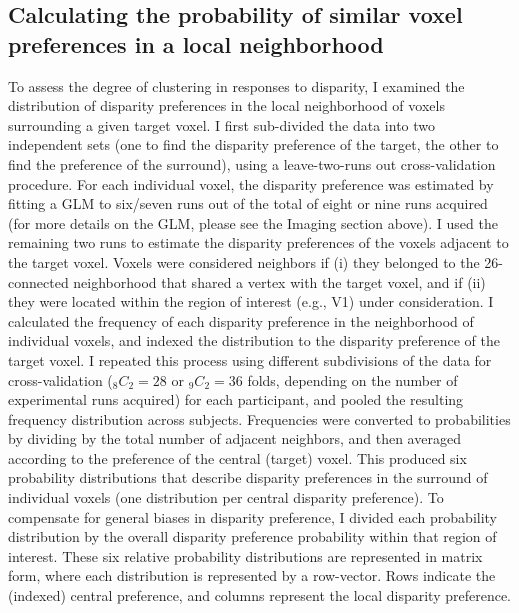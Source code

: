 \subsection{Calculating the probability of similar voxel preferences in a local neighborhood}
To assess the degree of clustering in responses to disparity, I examined the distribution of disparity preferences in the local neighborhood of voxels surrounding a given target voxel. I first sub-divided the data into two independent sets (one to find the disparity preference of the target, the other to find the preference of the surround), using a leave-two-runs out cross-validation procedure. For each individual voxel, the disparity preference was estimated by fitting a GLM to six/seven runs out of the total of eight or nine runs acquired (for more details on the GLM, please see the Imaging section above). I used the remaining two runs to estimate the disparity preferences of the voxels adjacent to the target voxel. Voxels were considered neighbors if (i) they belonged to the 26-connected neighborhood that shared a vertex with the target voxel, and if (ii) they were located within the region of interest (e.g., V1) under consideration. I calculated the frequency of each disparity preference in the neighborhood of individual voxels, and indexed the distribution to the disparity preference of the target voxel. I repeated this process using different subdivisions of the data for cross-validation ($_8C_2 = 28$ or $_9C_2 = 36$ folds, depending on the number of experimental runs acquired) for each participant, and pooled the resulting frequency distribution across subjects. Frequencies were converted to probabilities by dividing by the total number of adjacent neighbors, and then averaged according to the preference of the central (target) voxel. This produced six probability distributions that describe disparity preferences in the surround of individual voxels (one distribution per central disparity preference). To compensate for general biases in disparity preference, I divided each probability distribution by the overall disparity preference probability within that region of interest. These six relative probability distributions are represented in matrix form, where each distribution is represented by a row-vector. Rows indicate the (indexed) central preference, and columns represent the local disparity preference.

